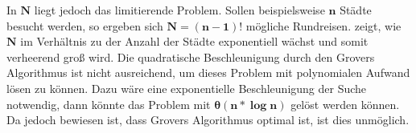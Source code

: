 In $\mathbf{N}$ liegt jedoch das limitierende Problem. Sollen beispielsweise $\mathbf{n}$ Städte besucht werden, so ergeben sich $\mathbf{N=(n-1)!}$ mögliche Rundreisen. 
 zeigt, wie $\mathbf{N}$ im Verhältnis zu der Anzahl der Städte exponentiell wächst und somit verheerend groß wird. 
Die quadratische Beschleunigung durch den Grovers Algorithmus ist nicht ausreichend, um dieses Problem mit polynomialen Aufwand lösen zu können. 
Dazu wäre eine exponentielle Beschleunigung der Suche notwendig, dann könnte das Problem mit $\mathbf{\theta (n * \log n)}$ gelöst werden können. 
Da jedoch bewiesen ist, dass Grovers Algorithmus optimal ist, ist dies unmöglich.